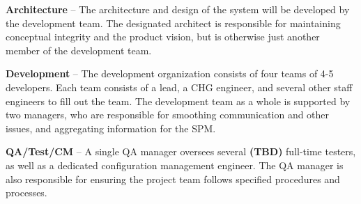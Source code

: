 \documentclass[11pt]{article}
\begin{document}
\textbf{Architecture} -- The architecture and design of the system will be developed by the development
team.  The designated architect is responsible for maintaining conceptual integrity and the product
vision, but is otherwise just another member of the development team.

\textbf{Development} -- The development organization consists of four teams of 4-5 developers.  Each
team consists of a lead, a CHG engineer, and several other staff engineers to fill out the team.
The development team as a whole is supported by two managers, who are responsible for smoothing
communication and other issues, and aggregating information for the SPM.

\textbf{QA/Test/CM} -- A single QA manager oversees several \textbf{(TBD)} full-time testers, as
well as a dedicated configuration management engineer.  The QA manager is also responsible for
ensuring the project team follows specified procedures and processes.



\end{document}
